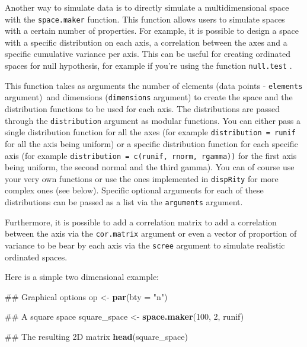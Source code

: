 \documentclass[]{book}
\newenvironment{Shaded}{\begin{snugshade}}{\end{snugshade}}
\newcommand{\KeywordTok}[1]{\textcolor[rgb]{0.13,0.29,0.53}{\textbf{#1}}}
\newcommand{\DataTypeTok}[1]{\textcolor[rgb]{0.13,0.29,0.53}{#1}}
\newcommand{\DecValTok}[1]{\textcolor[rgb]{0.00,0.00,0.81}{#1}}
\newcommand{\StringTok}[1]{\textcolor[rgb]{0.31,0.60,0.02}{#1}}
\newcommand{\NormalTok}[1]{#1}
\theoremstyle{definition}
\theoremstyle{definition}
\theoremstyle{definition}
\theoremstyle{remark}
\begin{document}
Another way to simulate data is to directly simulate a multidimensional
space with the \texttt{space.maker} function. This function allows users
to simulate spaces with a certain number of properties. For example, it
is possible to design a space with a specific distribution on each axis,
a correlation between the axes and a specific cumulative variance per
axis. This can be useful for creating ordinated spaces for null
hypothesis, for example if you're using the function \texttt{null.test}
\citep{diaz2016global}.

This function takes as arguments the number of elements (data points -
\texttt{elements} argument)~and dimensions (\texttt{dimensions}
argument) to create the space and the distribution functions to be used
for each axis. The distributions are passed through the
\texttt{distribution} argument as modular functions. You can either pass
a single distribution function for all the axes (for example
\texttt{distribution\ =\ runif} for all the axis being uniform) or a
specific distribution function for each specific axis (for example
\texttt{distribution\ =\ c(runif,\ rnorm,\ rgamma))} for the first axis
being uniform, the second normal and the third gamma). You can of course
use your very own functions or use the ones implemented in
\texttt{dispRity} for more complex ones (see below). Specific optional
arguments for each of these distributions can be passed as a list via
the \texttt{arguments} argument.

Furthermore, it is possible to add a correlation matrix to add a
correlation between the axis via the \texttt{cor.matrix} argument or
even a vector of proportion of variance to be bear by each axis via the
\texttt{scree} argument to simulate realistic ordinated spaces.

Here is a simple two dimensional example:

\begin{Shaded}
\begin{Highlighting}[]
\NormalTok{## Graphical options}
\NormalTok{op <-}\StringTok{ }\KeywordTok{par}\NormalTok{(}\DataTypeTok{bty =} \StringTok{"n"}\NormalTok{)}

\NormalTok{## A square space}
\NormalTok{square_space <-}\StringTok{ }\KeywordTok{space.maker}\NormalTok{(}\DecValTok{100}\NormalTok{, }\DecValTok{2}\NormalTok{, runif)}

\NormalTok{## The resulting 2D matrix}
\KeywordTok{head}\NormalTok{(square_space)}
\end{Highlighting}
\end{Shaded}
\end{document}
